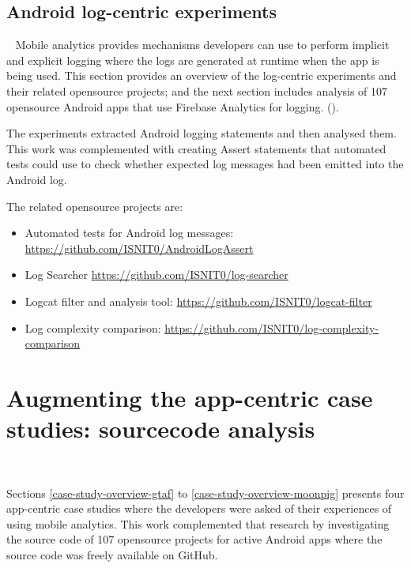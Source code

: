 \subsection{Android log-centric experiments}~\label{section-android-log-centric-experiments}
Mobile analytics provides mechanisms developers can use to perform implicit and explicit logging where the logs are generated at runtime when the app is being used. This section provides an overview of the log-centric experiments and their related opensource projects; and the next section includes analysis of 107 opensource Android apps that use Firebase Analytics for logging. (). 

The experiments extracted Android logging statements and then analysed them. This work was complemented with creating Assert statements that automated tests could use to check whether expected log messages had been emitted into the Android log.

The related opensource projects are:
\begin{itemize}
    \itemsep0em
    \item Automated tests for Android log messages: \url{https://github.com/ISNIT0/AndroidLogAssert}
    \item Log Searcher \url{https://github.com/ISNIT0/log-searcher}
    \item Logcat filter and analysis tool: \url{https://github.com/ISNIT0/logcat-filter}
    \item Log complexity comparison: \url{https://github.com/ISNIT0/log-complexity-comparison}
\end{itemize}

\clearpage

\section{Augmenting the app-centric case studies: sourcecode analysis}~\label{section-sourcecode-analysis-to-augment-app-centric-case-studies}



Sections \ref{case-study-overview-gtaf} to \ref{case-study-overview-moonpig} presents four app-centric case studies where the developers were asked of their experiences of using mobile analytics. This work complemented that research by investigating the source code of 107 opensource projects for active Android apps where the source code was freely available on GitHub. 

